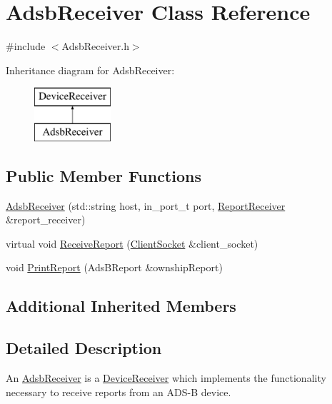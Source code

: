 \hypertarget{class_adsb_receiver}{}\section{Adsb\+Receiver Class Reference}
\label{class_adsb_receiver}


{\ttfamily \#include $<$Adsb\+Receiver.\+h$>$}

Inheritance diagram for Adsb\+Receiver\+:\begin{figure}[H]
\begin{center}
\leavevmode
\includegraphics[height=2.000000cm]{class_adsb_receiver}
\end{center}
\end{figure}
\subsection*{Public Member Functions}
\begin{DoxyCompactItemize}
\item 
\hyperlink{class_adsb_receiver_a7d08680b6859a3d5bf21640bcb81c3f8}{Adsb\+Receiver} (std\+::string host, in\+\_\+port\+\_\+t port, \hyperlink{class_report_receiver}{Report\+Receiver} \&report\+\_\+receiver)
\item 
virtual void \hyperlink{class_adsb_receiver_a7801fa4ad8f9f2b5d03364439f1d2476}{Receive\+Report} (\hyperlink{class_client_socket}{Client\+Socket} \&client\+\_\+socket)
\item 
void \hyperlink{class_adsb_receiver_acc902f601579d8320af05ccbc58de171}{Print\+Report} (Ads\+B\+Report \&ownship\+Report)
\end{DoxyCompactItemize}
\subsection*{Additional Inherited Members}


\subsection{Detailed Description}
An \hyperlink{class_adsb_receiver}{Adsb\+Receiver} is a \hyperlink{class_device_receiver}{Device\+Receiver} which implements the functionality necessary to receive reports from an A\+D\+S-\/\+B device. 

